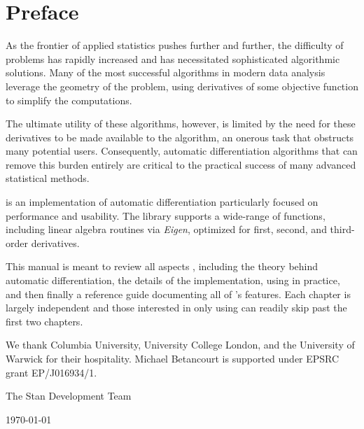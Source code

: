 \chapter*{Preface}

As the frontier of applied statistics pushes further and further, the
difficulty of problems has rapidly increased and has necessitated
sophisticated algorithmic solutions.  Many of the most successful
algorithms in modern data analysis leverage the geometry of the
problem, using derivatives of some objective function to simplify
the computations.

The ultimate utility of these algorithms, however, is limited by the
need for these derivatives to be made available to the algorithm,
an onerous task that obstructs many potential users.  Consequently,
automatic differentiation algorithms that can remove this burden
entirely are critical to the practical success of many advanced
statistical methods.

\nomad is an implementation of automatic differentiation particularly 
focused on performance and usability.  The library supports a wide-range 
of functions, including linear algebra routines via \textit{Eigen}, optimized
for first, second, and third-order derivatives.

This manual is meant to review
all aspects \nomad, including the theory behind automatic differentiation,
the details of the \nomad implementation, using \nomad in practice,
and then finally a reference guide documenting all of \nomad's features.
Each chapter is largely independent and those interested in only using
\nomad can readily skip past the first two chapters.

We thank Columbia University, University College London, and the University
of Warwick for their hospitality.  Michael Betancourt is supported under EPSRC 
grant EP/J016934/1.

\vspace{5mm}
\hfill The Stan Development Team

\hfill \today